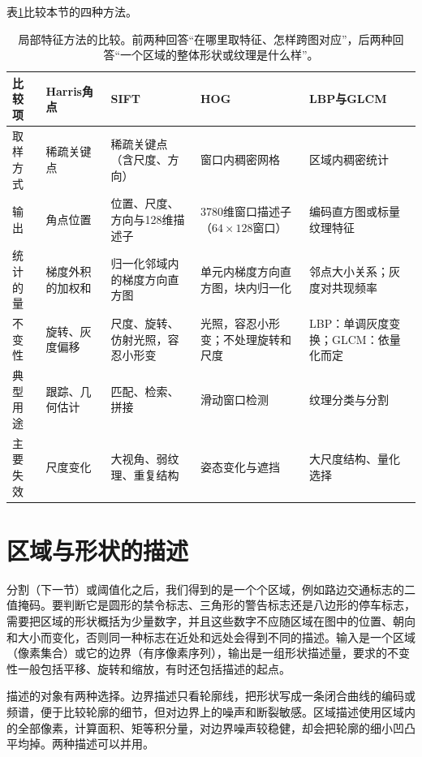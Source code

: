 表\ref{tab:vision-features-local-compare}比较本节的四种方法。

\begin{table}[tbp]
  \centering
  \small
  \begin{tabularx}{\linewidth}{@{}lXXXX@{}}
    \toprule
    比较项 & Harris角点 & SIFT & HOG & LBP与GLCM \\
    \midrule
    取样方式 & 稀疏关键点 & 稀疏关键点（含尺度、方向） & 窗口内稠密网格 & 区域内稠密统计 \\
    输出 & 角点位置 & 位置、尺度、方向与128维描述子 & 3780维窗口描述子（$64\times128$窗口） & 编码直方图或标量纹理特征 \\
    统计的量 & 梯度外积的加权和 & 归一化邻域内的梯度方向直方图 & 单元内梯度方向直方图，块内归一化 & 邻点大小关系；灰度对共现频率 \\
    不变性 & 旋转、灰度偏移 & 尺度、旋转、仿射光照，容忍小形变 & 光照，容忍小形变；不处理旋转和尺度 & LBP：单调灰度变换；GLCM：依量化而定 \\
    典型用途 & 跟踪、几何估计 & 匹配、检索、拼接 & 滑动窗口检测 & 纹理分类与分割 \\
    主要失效 & 尺度变化 & 大视角、弱纹理、重复结构 & 姿态变化与遮挡 & 大尺度结构、量化选择 \\
    \bottomrule
  \end{tabularx}
  \caption{局部特征方法的比较。前两种回答“在哪里取特征、怎样跨图对应”，后两种回答“一个区域的整体形状或纹理是什么样”。}
  \label{tab:vision-features-local-compare}
\end{table}

\section{区域与形状的描述}
\label{sec:vision-features-shape}

分割（下一节）或阈值化之后，我们得到的是一个个区域，例如路边交通标志的二值掩码。要判断它是圆形的禁令标志、三角形的警告标志还是八边形的停车标志，需要把区域的形状概括为少量数字，并且这些数字不应随区域在图中的位置、朝向和大小而变化，否则同一种标志在近处和远处会得到不同的描述。输入是一个区域（像素集合）或它的边界（有序像素序列），输出是一组形状描述量，要求的不变性一般包括平移、旋转和缩放，有时还包括描述的起点。

描述的对象有两种选择。边界描述只看轮廓线，把形状写成一条闭合曲线的编码或频谱，便于比较轮廓的细节，但对边界上的噪声和断裂敏感。区域描述使用区域内的全部像素，计算面积、矩等积分量，对边界噪声较稳健，却会把轮廓的细小凹凸平均掉。两种描述可以并用。

